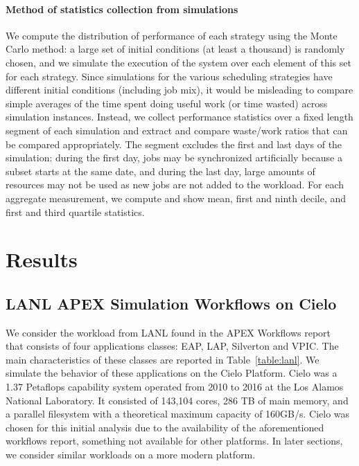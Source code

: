 \documentclass[two]{article}
\begin{document}
\paragraph*{Method of statistics collection from simulations}
We compute the distribution of performance of each strategy using the
Monte Carlo method: a large set of initial conditions (at least a
thousand) is randomly chosen, and we simulate the execution of the
system over each element of this set for each strategy. Since
simulations for the various scheduling strategies have different
initial conditions (including job mix), it would be misleading to
compare simple averages of the time spent doing useful work (or time
wasted) across simulation instances. Instead, we collect performance
statistics over a fixed length segment of each simulation and extract
and compare waste/work ratios that can be compared appropriately. The
segment excludes the first and last days of the simulation: during the
first day, jobs may be synchronized artificially because a subset
starts at the same date, and during the last day, large amounts of
resources may not be used as new jobs are not added to the workload.
For each aggregate measurement, we compute and show mean, first and
ninth decile, and first and third quartile statistics. 

%

\section{Results}\label{sec:results}

\subsection{LANL APEX Simulation Workflows on Cielo}

We consider the workload from LANL found in the APEX Workflows
report~\cite{apex2016} that consists of four applications classes: EAP, LAP,
Silverton and VPIC. The main characteristics of these classes are reported in
Table~\ref{table:lanl}. We simulate the behavior of these applications on the
Cielo Platform. Cielo was a 1.37 Petaflops capability system operated from 2010
to 2016 at the Los Alamos National Laboratory.  It consisted of 143,104 cores,
286 TB of main memory, and a parallel filesystem with a theoretical maximum
capacity of 160GB/s.  Cielo was chosen for this initial analysis due to the
availability of the aforementioned workflows report, something not available for
other platforms. In later sections, we consider similar workloads on a more
modern platform.
\end{document}
